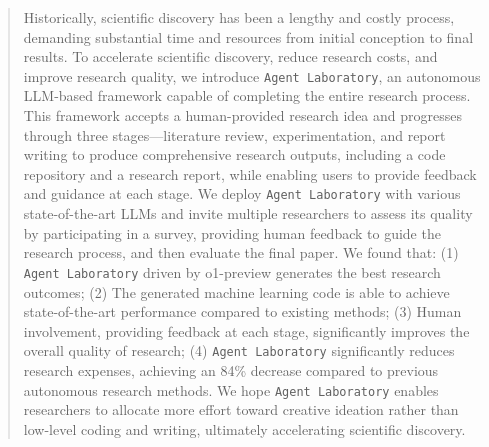 \documentclass[11pt, a4paper]{gdm_format}
\begin{document}
\begin{abstract}
Historically, scientific discovery has been a lengthy and costly process, demanding substantial time and resources from initial conception to final results.
To accelerate scientific discovery, reduce research costs, and improve research quality, we introduce \texttt{Agent Laboratory}, an autonomous LLM-based framework capable of completing the entire research process.
This framework accepts a human-provided research idea and progresses through three stages—literature review, experimentation, and report writing to produce comprehensive research outputs, including a code repository and a research report, while enabling users to provide feedback and guidance at each stage.
We deploy \texttt{Agent Laboratory} with various state-of-the-art LLMs and invite multiple researchers to assess its quality by participating in a survey, providing human feedback to guide the research process, and then evaluate the final paper. We found that: (1) \texttt{Agent Laboratory} driven by o1-preview generates the best research outcomes; (2) The generated machine learning code is able to achieve state-of-the-art performance compared to existing methods; (3) Human involvement, providing feedback at each stage, significantly improves the overall quality of research; (4) \texttt{Agent Laboratory} significantly reduces research expenses, achieving an 84\% decrease compared to previous autonomous research methods.
We hope \texttt{Agent Laboratory} enables researchers to allocate more effort toward creative ideation rather than low-level coding and writing, ultimately accelerating scientific discovery.









\end{abstract}
\end{document}
